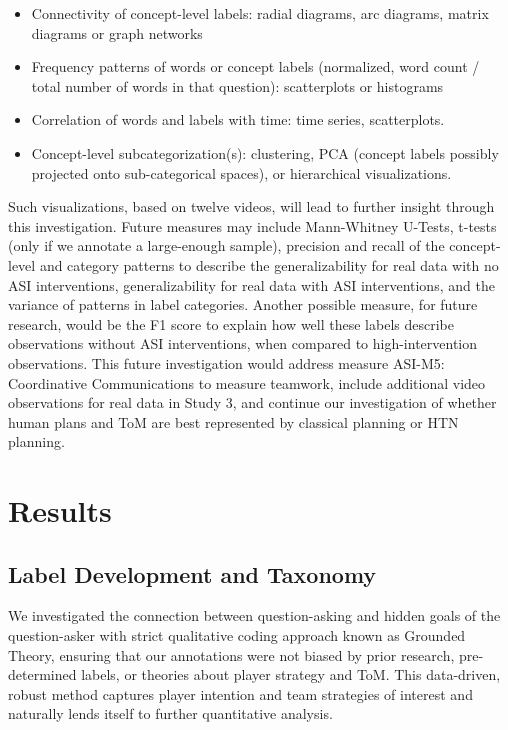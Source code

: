 \begin{itemize}

    \item Connectivity of concept-level labels: radial diagrams, arc diagrams,
        matrix diagrams or graph networks

    \item Frequency patterns of words or concept labels (normalized, word count
        / total number of words in that question): scatterplots or histograms

    \item Correlation of words and labels with time: time series, scatterplots. 

    \item Concept-level subcategorization(s): clustering, PCA (concept labels
        possibly projected onto sub-categorical spaces), or hierarchical
        visualizations.

\end{itemize}


Such visualizations, based on twelve videos, will lead to further insight
through this investigation. Future measures may include Mann-Whitney U-Tests,
t-tests (only if we annotate a large-enough sample), precision and recall of
the concept-level and category patterns to describe the generalizability for
real data with no ASI interventions, generalizability for real data with ASI
interventions, and the variance of patterns in label categories. Another
possible measure, for future research, would be the F1 score to explain how
well these labels describe observations without ASI interventions, when
compared to high-intervention observations. This future investigation would
address measure ASI-M5: Coordinative Communications to
measure teamwork, include additional video observations for real data in Study
3, and continue our investigation of whether human plans and ToM are best
represented by classical planning or HTN planning.



\section{Results}

\subsection{Label Development and Taxonomy}
We investigated the connection between question-asking and hidden goals of the question-asker with strict qualitative coding approach known as Grounded Theory, ensuring that our annotations were not biased by prior research, pre-determined labels, or theories about player strategy and ToM. This data-driven, robust method captures player intention and team strategies of interest and naturally lends itself to further quantitative analysis. 

